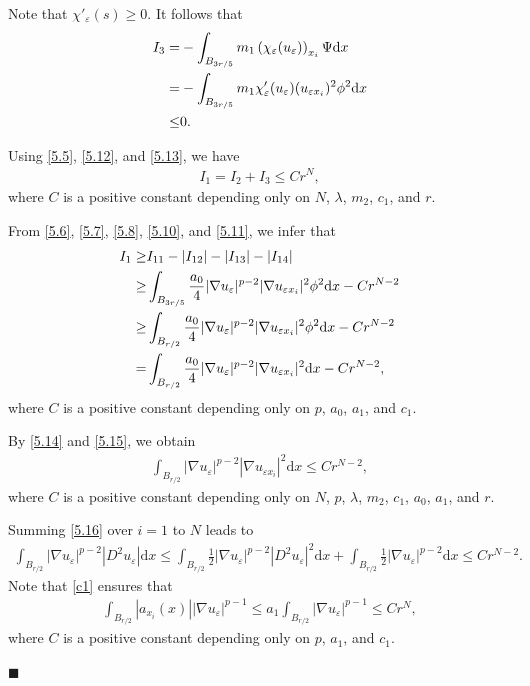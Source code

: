 \documentclass[onecolumn]{autart}
\newenvironment{proof}{{\it Proof: \enspace}}{\hfill $\blacksquare$\par}
\begin{document}
\begin{proof}
		Note that $\chi'_\varepsilon(s) \geq 0$. It follows that
		\begin{align}
			I_3
			=
			&-\int_{B_{3r/5}} m_1 \left( \chi_\varepsilon(u_\varepsilon) \right)_{x_i} \Psi  \mathrm{d}x
			\notag\\=
			&-\int_{B_{3r/5}} m_1 \chi'_{\varepsilon} (u_\varepsilon) (u_{\varepsilon x_i})^2 \phi^2\mathrm{d}x
			\notag\\ \leq
			& 0 .\label{5.13}
		\end{align}
		
		Using \eqref{5.5}, \eqref{5.12}, and \eqref{5.13}, we have
		\begin{align}\label{5.14}
			I_1=I_2+I_3\leq Cr^N,
		\end{align}
		where $C$ is a positive  constant depending  only on $N$, $\lambda$, $m_2$, $c_1$,  and $r$.
		
		From \eqref{5.6}, \eqref{5.7}, \eqref{5.8}, \eqref{5.10}, and \eqref{5.11}, we infer that
		\begin{align}
			I_1
			\geq
			& I_{11}-|I_{12}|-|I_{13}|-|I_{14}|
			\notag\\\geq
			& \int_{B_{3r/5}} \frac{ a_0 }{4} |\nabla u_\varepsilon|^{p-2} |\nabla u_{\varepsilon x_i}|^2\phi^2\mathrm{d}x  - Cr^{N-2}
			\notag\\ \geq
			& \int_{B_{r/2}} \frac{ a_0 }{4} |\nabla u_\varepsilon|^{p-2} |\nabla u_{\varepsilon x_i}|^2\phi^2\mathrm{d}x  - Cr^{N-2}
			\notag\\ =
			& \int_{B_{r/2}} \frac{ a_0 }{4} |\nabla u_\varepsilon|^{p-2} |\nabla u_{\varepsilon x_i}|^2\mathrm{d}x  - Cr^{N-2},\label{5.15}
		\end{align}
		where $C$ is a positive  constant depending  only on $p$, $a_0$, $a_1$, and $c_1$.
		
		{By \eqref{5.14} and \eqref{5.15},}	 we obtain
		\begin{align}\label{5.16}
			\int_{B_{r/2}}  |\nabla u_\varepsilon|^{p-2} |\nabla u_{\varepsilon x_i}|^2\mathrm{d}x  \leq Cr^{N-2},
		\end{align}
		where $C$ is a positive  constant depending  only on $N$, $p$, $\lambda$, $m_2$, $c_1$,   $a_0$,  $a_1$,  and $r$.
		
		Summing \eqref{5.16} over $i=1$ to $N$ leads to
		\begin{align}\label{5.17}
			\int_{B_{r/2}}  |\nabla u_\varepsilon|^{p-2} |D^2u_\varepsilon |\mathrm{d}x  \leq \int_{B_{r/2}} \frac{1}{2} |\nabla u_\varepsilon|^{p-2} |D^2u_\varepsilon |^2\mathrm{d}x + \int_{B_{r/2}} \frac{1}{2} |\nabla u_\varepsilon|^{p-2} \mathrm{d}x\leq Cr^{N-2}.
		\end{align}
		Note that \eqref{c1} ensures that
		\begin{align}\label{5.18}
			\int_{B_{r/2}}|a_{x_i}(x)| |\nabla u_\varepsilon|^{p-1} \leq a_1 \int_{B_{r/2}} |\nabla u_\varepsilon|^{p-1} \leq Cr^N,
		\end{align}
		where $C$ is a positive  constant depending  only on  $p$, $a_1$, and $c_1$.
		

\end{proof}
\end{document}
